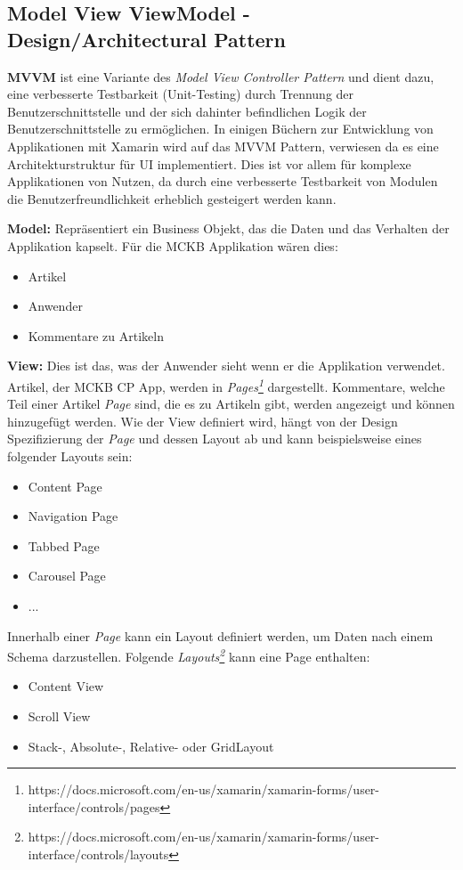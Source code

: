 \subsection{Model View ViewModel - Design/Architectural Pattern}
\label{sec:xamarinformsmvvm}
	
	\textbf{MVVM} ist eine Variante des \textit{Model View Controller Pattern} und dient dazu, eine verbesserte Testbarkeit (Unit-Testing) durch Trennung der Benutzerschnittstelle und der sich dahinter befindlichen Logik der Benutzerschnittstelle zu ermöglichen. In einigen Büchern zur Entwicklung von Applikationen mit Xamarin wird auf das MVVM Pattern, verwiesen da es eine Architekturstruktur für UI implementiert\cite{book:Xamarin.Forms-Essentials:}. Dies ist vor allem für komplexe Applikationen von Nutzen, da durch eine verbesserte Testbarkeit von Modulen die Benutzerfreundlichkeit erheblich gesteigert werden kann.

	\textbf{Model:} Repräsentiert ein Business Objekt, das die Daten und das Verhalten der Applikation kapselt. Für die MCKB Applikation wären dies:
	\begin{itemize}
		\setlength\itemsep{0em}
		\item Artikel
		\item Anwender
		\item Kommentare zu Artikeln
	\end{itemize}

	\textbf{View:} Dies ist das, was der Anwender sieht wenn er die Applikation verwendet. Artikel, der MCKB CP App, werden in \textit{Pages\footnote{https://docs.microsoft.com/en-us/xamarin/xamarin-forms/user-interface/controls/pages}} dargestellt. Kommentare, welche Teil einer Artikel \textit{Page} sind, die es zu Artikeln gibt, werden angezeigt und können hinzugefügt werden. Wie der View definiert wird, hängt von der Design Spezifizierung der \textit{Page} und dessen Layout ab und kann beispielsweise eines folgender Layouts sein:
	\begin{itemize}
		\setlength\itemsep{0em}
		\item Content Page
		\item Navigation Page
		\item Tabbed Page
		\item Carousel Page
		\item ...
	\end{itemize}
	Innerhalb einer \textit{Page} kann ein Layout definiert werden, um Daten nach einem Schema darzustellen. Folgende \textit{Layouts\footnote{https://docs.microsoft.com/en-us/xamarin/xamarin-forms/user-interface/controls/layouts}} kann eine Page enthalten:
	\begin{itemize}
		\setlength\itemsep{0em}
		\item Content View
		\item Scroll View
		\item Stack-, Absolute-, Relative- oder GridLayout
	\end{itemize}

